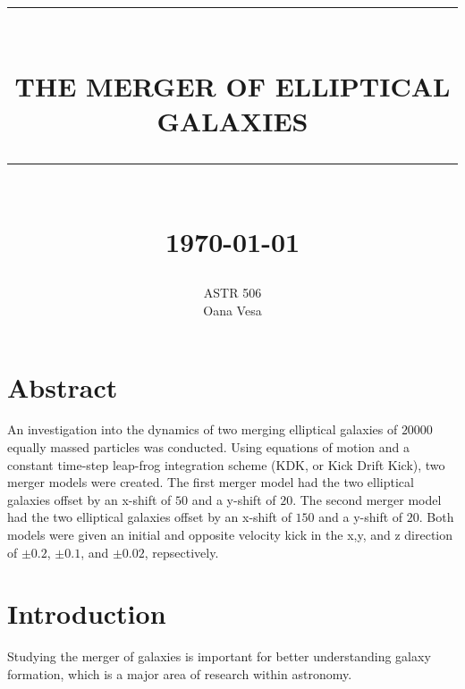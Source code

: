 \documentclass[12pt]{report}
\newcommand{\HRule}[1]{\rule{\linewidth}{#1}}
\begin{document}
\title{ \normalsize \textsc{}
		\\ [2.0cm]
		\HRule{0.5pt} \\
		\LARGE \textbf{\uppercase{The Merger of Elliptical Galaxies}}
		\HRule{2pt} \\ [0.5cm]
		\normalsize \today \vspace*{5\baselineskip}}

\date{}

\author{ ASTR 506  \\
		Oana Vesa}

\maketitle
\tableofcontents
\newpage

\sectionfont{\scshape}


\section*{Abstract}

An investigation into the dynamics of two merging elliptical galaxies of $20000$ equally massed particles was conducted. Using equations of motion and a constant time-step leap-frog integration scheme (KDK, or Kick Drift Kick), two merger models were created. The first merger model had the two elliptical galaxies offset by an x-shift of $50$ and a y-shift of $20$. The second merger model had the two elliptical galaxies offset by an x-shift of $150$ and a y-shift of $20$. Both models were given an initial and opposite velocity kick in the x,y, and z direction of $\pm 0.2$, $\pm 0.1$, and $\pm 0.02$, repsectively.


\section*{Introduction}

Studying the merger of galaxies is important for better understanding galaxy formation, which is a major area of research within astronomy.
\end{document}
